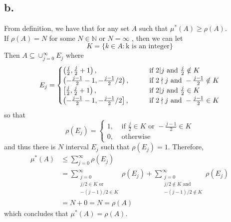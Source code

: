 \documentclass[11pt]{article}
\theoremstyle{mystyle}
\theoremstyle{definition}
\begin{document}
\subsection*{b.}
From definition, we have that for any set $A$ such that $\mu^*(A) \ge \rho(A)$. \\ 
If $\rho(A) = N$ for some $N \in \mathbb{N}$ or $N = \infty$ , then we can let 
\[
  K = \{k \in A: \text{k is an integer} \}
\]
Then $A \subseteq \cup_{j=0}^\infty E_j$ where 
\[
  E_j = 
  \begin{cases}
    \left(\frac{j}{2},\frac{j}{2} + 1\right), \indent &\text{ if } 2|j \text{ and } \frac{j}{2} \notin K\\
    \left(-\frac{j-1}{2} -1,-\frac{j-1}{2}/2\right), \indent &\text{ if } 2\nmid j \text{ and } -\frac{j-1}{2} \notin K \\
    \left[\frac{j}{2},\frac{j}{2} + 1\right), \indent &\text{ if } 2|j \text{ and } \frac{j}{2} \in K \\
    \left(-\frac{j-1}{2} -1,-\frac{j-1}{2}/2\right], \indent &\text{ if } 2\nmid j \text{ and } -\frac{j-1}{2} \in K \\
  \end{cases}
\]
so that 
\[
  \rho(E_j) = 
  \begin{cases}
    1, &\text{ if } \frac{j}{2} \in K \text{ or } -\frac{j-1}{2} \in K \\
    0, &\text{ otherwise}
  \end{cases}
\]
and thus there is $N$ interval $E_j$ such that $\rho(E_j) = 1$. Therefore,
\begin{align*}  
  \mu^*(A) 
  &\le \sum_{j=0}^\infty \rho(E_j) \\
  &=  \sum_{\substack{j=0 \\ j/2 \in K \text{ or } \\ -(j-1)/2 \in K}}^\infty \rho(E_j) 
  +  \sum_{\substack{j=0 \\ j/2 \notin K \text{ and } \\ -(j-1)/2 \notin K}}^\infty \rho(E_j) \\
  &= N + 0 = N = \rho(A) 
\end{align*}
which concludes that $\mu^*(A) = \rho(A)$. 
\end{document}
